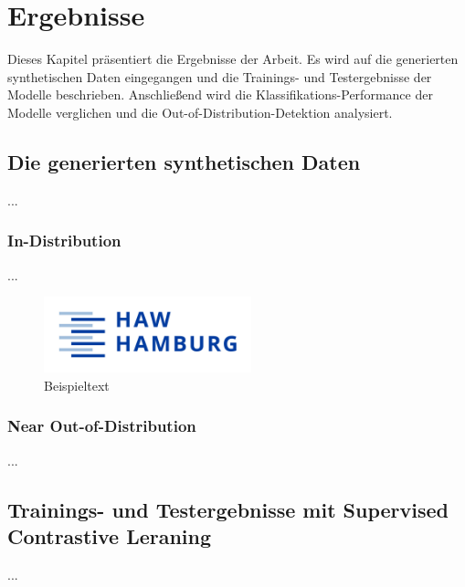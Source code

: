 \chapter{Ergebnisse}

Dieses Kapitel präsentiert die Ergebnisse der Arbeit. Es wird auf die generierten synthetischen Daten eingegangen und die Trainings- und Testergebnisse der Modelle beschrieben. Anschließend wird die Klassifikations-Performance der Modelle verglichen und die Out-of-Distribution-Detektion analysiert.

\section{Die generierten synthetischen Daten}

...

\subsection{In-Distribution}

...

\begin{figure}[]
	\centering
	\includegraphics[width=6cm]{HAW_Marke_RGB_300dpi}
	\caption{Beispieltext}
\end{figure}

\subsection{Near Out-of-Distribution}

...

\section{Trainings- und Testergebnisse mit Supervised Contrastive Leraning}

...

